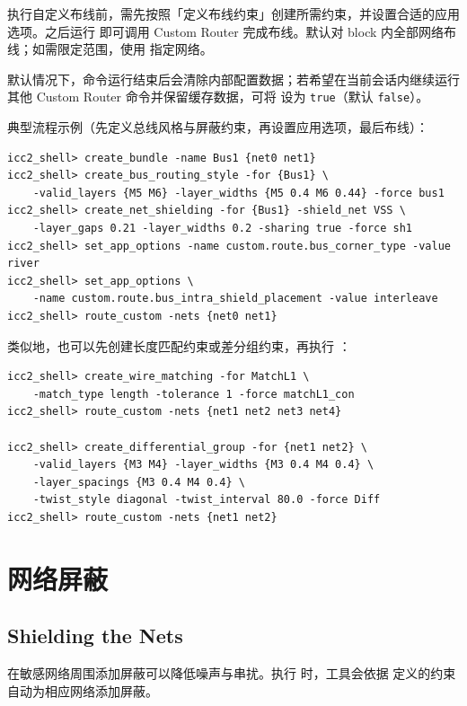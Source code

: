 执行自定义布线前，需先按照「定义布线约束」创建所需约束，并设置合适的应用选项。之后运行  即可调用 Custom Router 完成布线。默认对 block 内全部网络布线；如需限定范围，使用  指定网络。

默认情况下，命令运行结束后会清除内部配置数据；若希望在当前会话内继续运行其他 Custom Router 命令并保留缓存数据，可将  设为 \texttt{true}（默认 \texttt{false}）。

典型流程示例（先定义总线风格与屏蔽约束，再设置应用选项，最后布线）：

\begin{lstlisting}
icc2_shell> create_bundle -name Bus1 {net0 net1}
icc2_shell> create_bus_routing_style -for {Bus1} \
    -valid_layers {M5 M6} -layer_widths {M5 0.4 M6 0.44} -force bus1
icc2_shell> create_net_shielding -for {Bus1} -shield_net VSS \
    -layer_gaps 0.21 -layer_widths 0.2 -sharing true -force sh1
icc2_shell> set_app_options -name custom.route.bus_corner_type -value river
icc2_shell> set_app_options \
    -name custom.route.bus_intra_shield_placement -value interleave
icc2_shell> route_custom -nets {net0 net1}
\end{lstlisting}

类似地，也可以先创建长度匹配约束或差分组约束，再执行 ：

\begin{lstlisting}
icc2_shell> create_wire_matching -for MatchL1 \
    -match_type length -tolerance 1 -force matchL1_con
icc2_shell> route_custom -nets {net1 net2 net3 net4}

icc2_shell> create_differential_group -for {net1 net2} \
    -valid_layers {M3 M4} -layer_widths {M3 0.4 M4 0.4} \
    -layer_spacings {M3 0.4 M4 0.4} \
    -twist_style diagonal -twist_interval 80.0 -force Diff
icc2_shell> route_custom -nets {net1 net2}
\end{lstlisting}

\section{网络屏蔽}
\subsection*{Shielding the Nets}

在敏感网络周围添加屏蔽可以降低噪声与串扰。执行 \cmd{route\_custom} 时，工具会依据  定义的约束自动为相应网络添加屏蔽。

